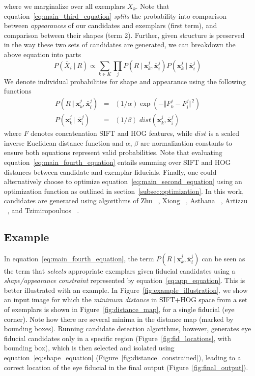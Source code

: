 where we marginalize over all exemplars $X_k$. Note that
equation~\ref{eq:main_third_equation} \emph{splits} the probability into comparison between
\emph{appearances} of our candidates and exemplars (first term), and comparison between their
shapes (term 2). Further, given structure is preserved in the way these two sets of candidates are 
generated, we can breakdown the above equation into parts
\begin{equation}
  P( \bar{X}_i~|~R ) \propto \sum_{k\in K} \prod_j P( R~|~\mathbf{x}_k^j, \bar{\mathbf{x}}_i^j) P( \mathbf{x}_k^j~|~\bar{\mathbf{x}}_i^j )
  \label{eq:main_fourth_equation}
\end{equation}
We denote individual probabilities for shape and appearance using the following functions
\begin{eqnarray}
  P( R~|~\mathbf{x}_k^j, \bar{\mathbf{x}}_i^j) & = & (1/\alpha) \exp( -\Vert F_k^j - F_i^j \Vert^2 ) 
  \label{eq:app_equation} \\
  P( \mathbf{x}_k^j~|~\bar{\mathbf{x}}_i^j )  & = & (1/\beta) \; dist( \mathbf{x}_k^j, \bar{\mathbf{x}}_i^j )
  \label{eq:shape_equation}
\end{eqnarray}
where $F$ denotes concatenation SIFT and HOG features, while $dist$ is a scaled inverse Euclidean
distance function and $\alpha$, $\beta$ are normalization constants to ensure both equations represent valid probabilities. Note that evaluating equation~\ref{eq:main_fourth_equation} 
entails summing over SIFT and HOG distances between candidate and exemplar fiducials.
Finally, one could alternatively choose to optimize equation~\ref{eq:main_second_equation} using
an optimization function as outlined in section~\ref{subsec:optimization}.
In this work, candidates are generated using algorithms of Zhu \etal~\cite{xhuCVPR12_wild}, 
Xiong \etal~\cite{xiongCVPR13_SDM}, Asthana \etal~\cite{asthanaCVPR14_Chehra}, Artizzu
\etal~\cite{artizzzuICCV13_COFW}, and Tzimiropouluos \etal~\cite{Tzimiropoulos_2015_CVPR}.

\subsection{Example}
In equation~\ref{eq:main_fourth_equation}, the term $P( R~|~\mathbf{x}_k^j,\bar{\mathbf{x}}_i^j )$
can be seen as the term that \emph{selects} appropriate exemplars given fiducial candidates 
using a \emph{shape/appearance constraint} represented by equation~\ref{eq:app_equation}. This is better
illustrated with an example. In Figure~\ref{fig:example_illustration}, we show an input image
for which the \emph{minimum distance} in SIFT+HOG space from a set of exemplars is shown in 
Figure~\ref{fig:distance_map}, for a single fiducial (eye corner). Note how there are several
minima in the distance map (marked by bounding boxes). Running candidate detection algorithms,
however, generates eye fiducial candidates only in a specific region (Figure~\ref{fig:fid_locations}, with
bounding box), which is then selected and isolated using equation~\ref{eq:shape_equation}
(Figure~\ref{fig:distance_constrained}), leading to a correct location of the eye fiducial in the
final output (Figure~\ref{fig:final_output}).

